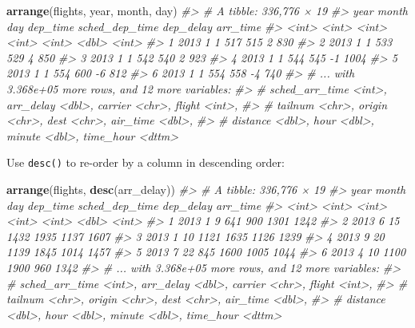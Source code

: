 \documentclass[]{book}
\newenvironment{Shaded}{\begin{snugshade}}{\end{snugshade}}
\newcommand{\KeywordTok}[1]{\textcolor[rgb]{0.13,0.29,0.53}{\textbf{{#1}}}}
\newcommand{\CommentTok}[1]{\textcolor[rgb]{0.56,0.35,0.01}{\textit{{#1}}}}
\newcommand{\NormalTok}[1]{{#1}}
\begin{document}
\begin{Shaded}
\begin{Highlighting}[]
\KeywordTok{arrange}\NormalTok{(flights, year, month, day)}
\CommentTok{#> # A tibble: 336,776 × 19}
\CommentTok{#>    year month   day dep_time sched_dep_time dep_delay arr_time}
\CommentTok{#>   <int> <int> <int>    <int>          <int>     <dbl>    <int>}
\CommentTok{#> 1  2013     1     1      517            515         2      830}
\CommentTok{#> 2  2013     1     1      533            529         4      850}
\CommentTok{#> 3  2013     1     1      542            540         2      923}
\CommentTok{#> 4  2013     1     1      544            545        -1     1004}
\CommentTok{#> 5  2013     1     1      554            600        -6      812}
\CommentTok{#> 6  2013     1     1      554            558        -4      740}
\CommentTok{#> # ... with 3.368e+05 more rows, and 12 more variables:}
\CommentTok{#> #   sched_arr_time <int>, arr_delay <dbl>, carrier <chr>, flight <int>,}
\CommentTok{#> #   tailnum <chr>, origin <chr>, dest <chr>, air_time <dbl>,}
\CommentTok{#> #   distance <dbl>, hour <dbl>, minute <dbl>, time_hour <dttm>}
\end{Highlighting}
\end{Shaded}

Use \texttt{desc()} to re-order by a column in descending order:

\begin{Shaded}
\begin{Highlighting}[]
\KeywordTok{arrange}\NormalTok{(flights, }\KeywordTok{desc}\NormalTok{(arr_delay))}
\CommentTok{#> # A tibble: 336,776 × 19}
\CommentTok{#>    year month   day dep_time sched_dep_time dep_delay arr_time}
\CommentTok{#>   <int> <int> <int>    <int>          <int>     <dbl>    <int>}
\CommentTok{#> 1  2013     1     9      641            900      1301     1242}
\CommentTok{#> 2  2013     6    15     1432           1935      1137     1607}
\CommentTok{#> 3  2013     1    10     1121           1635      1126     1239}
\CommentTok{#> 4  2013     9    20     1139           1845      1014     1457}
\CommentTok{#> 5  2013     7    22      845           1600      1005     1044}
\CommentTok{#> 6  2013     4    10     1100           1900       960     1342}
\CommentTok{#> # ... with 3.368e+05 more rows, and 12 more variables:}
\CommentTok{#> #   sched_arr_time <int>, arr_delay <dbl>, carrier <chr>, flight <int>,}
\CommentTok{#> #   tailnum <chr>, origin <chr>, dest <chr>, air_time <dbl>,}
\CommentTok{#> #   distance <dbl>, hour <dbl>, minute <dbl>, time_hour <dttm>}
\end{Highlighting}
\end{Shaded}
\end{document}
